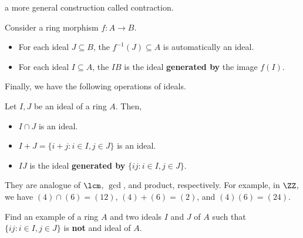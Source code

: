 a more general construction called contraction.
\begin{definition}
    Consider a ring morphism
    $f : A\to B$. 
    \begin{itemize}
    \item For each ideal $J\subseteq B$,
    the  
    $f^{-1}(J)\subseteq A$ is automatically an ideal.
    \item For each ideal $I\subseteq A$,
    the  $IB$
    is the ideal \textbf{generated by} the image $f(I)$.
    \end{itemize}
\end{definition}
Finally, we have the following operations of ideals.
\begin{definition}
    Let $I,J$ be an ideal of a ring $A$. Then,
    \begin{itemize}
    \item $I\cap J$ is an ideal.
    \item $I+J = \{i+j : i\in I, j\in J\}$ is an ideal.
    \item $IJ$ is the ideal \textbf{generated by} $\{ij : i\in I, j\in J\}$.
    \end{itemize}
    They are analogue of $\lcm$, $\gcd$, and product, respectively.
    For example, in $\ZZ$, we have 
    $(4)\cap (6) = (12)$, $(4)+(6)=(2)$,
    and $(4)(6) = (24)$.
\end{definition}
\begin{exercise}
Find an example of a ring $A$ and two ideals $I$ and $J$
of $A$ such that $\{ij : i\in I, j\in J\}$ is 
\textbf{not} and ideal of $A$.
\end{exercise}
